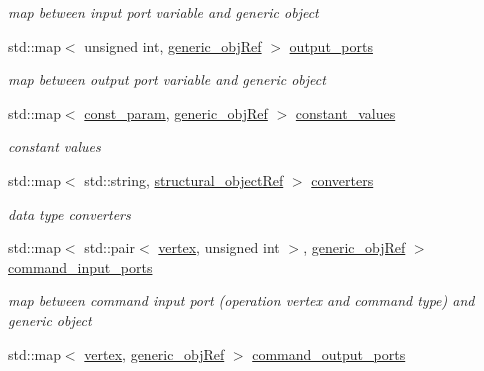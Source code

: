 \begin{DoxyCompactItemize}
\begin{DoxyCompactList}\small\item\em map between input port variable and generic object \end{DoxyCompactList}\item 
std\+::map$<$ unsigned int, \hyperlink{generic__obj_8hpp_acb533b2ef8e0fe72e09a04d20904ca81}{generic\+\_\+obj\+Ref} $>$ \hyperlink{classconn__binding_af6e110c11925ff778bb1f895d1dc078f}{output\+\_\+ports}
\begin{DoxyCompactList}\small\item\em map between output port variable and generic object \end{DoxyCompactList}\item 
std\+::map$<$ \hyperlink{classconn__binding_a08cb5241cd588e215f61ab30d27a14c0}{const\+\_\+param}, \hyperlink{generic__obj_8hpp_acb533b2ef8e0fe72e09a04d20904ca81}{generic\+\_\+obj\+Ref} $>$ \hyperlink{classconn__binding_a4f1b9a9fec4cdc7cbac192dd943aed23}{constant\+\_\+values}
\begin{DoxyCompactList}\small\item\em constant values \end{DoxyCompactList}\item 
std\+::map$<$ std\+::string, \hyperlink{structural__objects_8hpp_a8ea5f8cc50ab8f4c31e2751074ff60b2}{structural\+\_\+object\+Ref} $>$ \hyperlink{classconn__binding_a00109a76f23a1c32f8c7d1a85bf2c290}{converters}
\begin{DoxyCompactList}\small\item\em data type converters \end{DoxyCompactList}\item 
std\+::map$<$ std\+::pair$<$ \hyperlink{graph_8hpp_abefdcf0544e601805af44eca032cca14}{vertex}, unsigned int $>$, \hyperlink{generic__obj_8hpp_acb533b2ef8e0fe72e09a04d20904ca81}{generic\+\_\+obj\+Ref} $>$ \hyperlink{classconn__binding_a37d4850b1509016aefb78063be87bf97}{command\+\_\+input\+\_\+ports}
\begin{DoxyCompactList}\small\item\em map between command input port (operation vertex and command type) and generic object \end{DoxyCompactList}\item 
std\+::map$<$ \hyperlink{graph_8hpp_abefdcf0544e601805af44eca032cca14}{vertex}, \hyperlink{generic__obj_8hpp_acb533b2ef8e0fe72e09a04d20904ca81}{generic\+\_\+obj\+Ref} $>$ \hyperlink{classconn__binding_ad312dee69a14b9c6598f5af99308a87a}{command\+\_\+output\+\_\+ports}

\end{DoxyCompactItemize}
